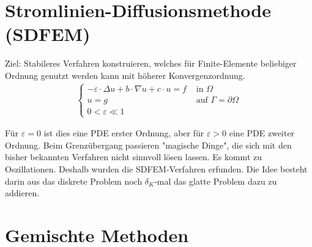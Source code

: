 \documentclass[12pt]{scrartcl}
\begin{document}
	
	\section{Stromlinien-Diffusionsmethode (SDFEM)}
	
	Ziel: Stabileres Verfahren konstruieren, welches für Finite-Elemente beliebiger Ordnung genutzt werden kann mit höherer Konvergenzordnung.
	\begin{align*}
\left\lbrace
	\begin{array}{rl}
	-\varepsilon\cdot\Delta u+b\cdot \nabla u+c\cdot u=f&\text{ in }\Omega\\
	u=g&\text{ auf }\Gamma=\partial\Omega\\
	0<\varepsilon\ll 1&
	\end{array}
	\right.
\end{align*}

	Für $\varepsilon=0$ ist dies eine PDE erster Ordnung, aber für $\varepsilon>0$ eine PDE zweiter Ordnung.
	Beim Grenzübergang passieren "magische Dinge", die sich mit den bisher bekannten Verfahren nicht sinnvoll lösen lassen.
	Es kommt zu Oszillationen.
	Deshalb wurden die SDFEM-Verfahren erfunden.
	Die Idee besteht darin aus das diskrete Problem noch $\delta_K$-mal das glatte Problem dazu zu addieren.
	
	\section{Gemischte Methoden}
	
\end{document}
